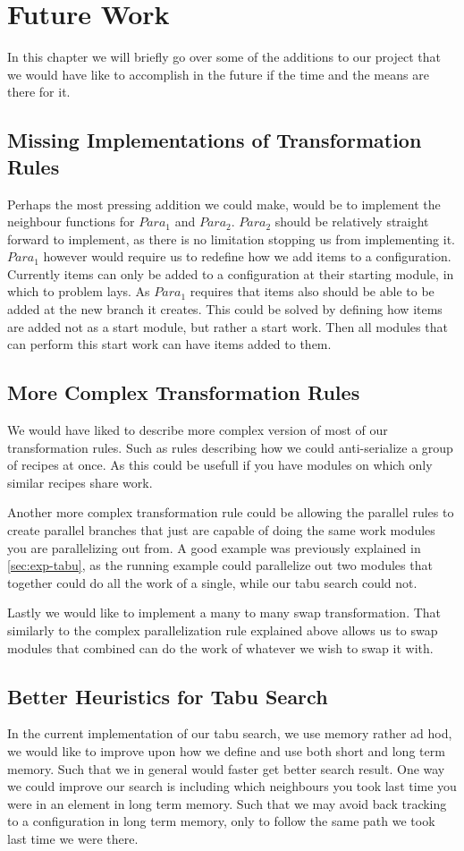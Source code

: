 \chapter{Future Work}
In this chapter we will briefly go over some of the additions to our project that we would have like to accomplish in the future if the time and the means are there for it.


\section{Missing Implementations of Transformation Rules}
Perhaps the most pressing addition we could make, would be to implement the neighbour functions for $Para_1$ and $Para_2$. $Para_2$ should be relatively straight forward to implement, as there is no limitation stopping us from implementing it. $Para_1$ however would require us to redefine how we add items to a configuration. Currently items can only be added to a configuration at their starting module, in which to problem lays. As $Para_1$ requires that items also should be able to be added at the new branch it creates. This could be solved by defining how items are added not as a start module, but rather a start work. Then all modules that can perform this start work can have items added to them.

\section{More Complex Transformation Rules}
We would have liked to describe more complex version of most of our transformation rules. Such as rules describing how we could anti-serialize a group of recipes at once. As this could be usefull if you have modules on which only similar recipes share work.

Another more complex transformation rule could be allowing the parallel rules to create parallel branches that just are capable of doing the same work modules you are parallelizing out from. A good example was previously explained in \cref{sec:exp-tabu}, as the running example could parallelize out two modules that together could do all the work of a single, while our tabu search could not.

Lastly we would like to implement a many to many swap transformation. That similarly to the complex parallelization rule explained above allows us to swap modules that combined can do the work of whatever we wish to swap it with.

\section{Better Heuristics for Tabu Search}
In the current implementation of our tabu search, we use memory rather ad hod, we would like to improve upon how we define and use both short and long term memory. Such that we in general would faster get better search result. One way we could improve our search is including which neighbours you took last time you were in an element in long term memory. Such that we may avoid back tracking to a configuration in long term memory, only to follow the same path we took last time we were there.

 




